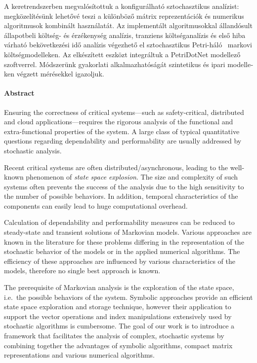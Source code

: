 \begin{otherlanguage}{magyar}
  A keretrendszerben megvalósítottuk a konfigurálható sztochasztikus
  analízist\hspace{1pt}: megközelítésünk lehetővé teszi a különböző
  mátrix reprezentációk és numerikus algoritmusok kombinált
  használatát. Az implementált algoritmusokkal állandósult állapotbeli
  költség- és érzékenység analízis, tranziens költséganalízis és első
  hiba várható bekövetkezési idő analízis végezhető el sztochasztikus
  Petri-háló~ markovi költségmodelleken. Az
  elkészített eszközt integráltuk a PetriDotNet modellező
  szoftverrel. Módszerünk gyakorlati alkalmazhatóságát szintetikus és
  ipari modelleken végzett mérésekkel igazoljuk.

\end{otherlanguage}

\cleardoublepage

\thispagestyle{plain}
\paragraph*{Abstract}

Ensuring the correctness of critical systems---such as
safety-critical, distributed and cloud applications---requires the
rigorous analysis of the functional and extra-functional properties of
the system. A large class of typical quantitative questions regarding
dependability and performability are usually addressed by stochastic
analysis.

Recent critical systems are often distributed/asynchronous, leading to
the well-known phenomenon of \emph{state space explosion}. The size
and complexity of such systems often prevents the success of the
analysis due to the high sensitivity to the number of possible
behaviors. In addition, temporal characteristics of the components can
easily lead to huge computational overhead.

Calculation of dependability and performability measures can be
reduced to steady-state and transient solutions of Markovian
models. Various approaches are known in the literature for these
problems differing in the representation of the stochastic behavior of
the models or in the applied numerical algorithms. The efficiency of
these approaches are influenced by various characteristics of the
models, therefore no single best approach is known.

The prerequisite of Markovian analysis is the exploration of the state
space, i.e.~the possible behaviors of the system. Symbolic approaches
provide an efficient state space exploration and storage technique,
however their application to support the vector operations and index
manipulations extensively used by stochastic algorithms is cumbersome.
The goal of our work is to introduce a framework that facilitates the
analysis of complex, stochastic systems by combining together the
advantages of symbolic algorithms, compact matrix representations and
various numerical algorithms.

